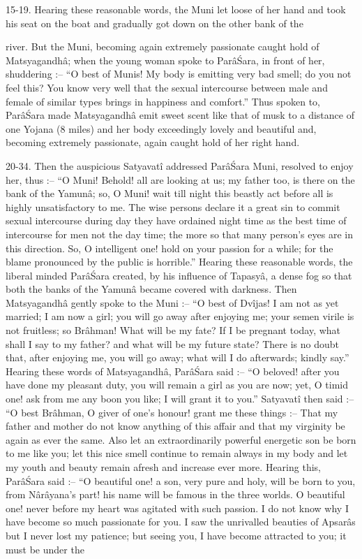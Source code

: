 15-19. Hearing these reasonable words, the Muni let loose of her hand and took his seat on the boat and gradually got down on the other bank of the


river. But the Muni, becoming again extremely passionate caught hold of Matsyagandh\^a; when the young woman spoke to Par\^a\'Sara, in front of her, shuddering :-- ``O best of Munis! My body is emitting very bad smell; do you not feel this? You know very well that the sexual intercourse between male and female of similar types brings in happiness and comfort.'' Thus spoken to, Par\^a\'Sara made Matsyagandh\^a emit sweet scent like that of musk to a distance of one Yojana (8 miles) and her body exceedingly lovely and beautiful and, becoming extremely passionate, again caught hold of her right hand.

20-34. Then the auspicious Satyavat\^i addressed Par\^a\'Sara Muni, resolved to enjoy her, thus :-- ``O Muni! Behold! all are looking at us; my father too, is there on the bank of the Yamun\^a; so, O Muni! wait till night this beastly act before all is highly unsatisfactory to me. The wise persons declare it a great sin to commit sexual intercourse during day they have ordained night time as the best time of intercourse for men not the day time; the more so that many person's eyes are in this direction. So, O intelligent one! hold on your passion for a while; for the blame pronounced by the public is horrible.'' Hearing these reasonable words, the liberal minded Par\^a\'Sara created, by his influence of Tapasy\^a, a dense fog so that both the banks of the Yamun\^a became covered with darkness. Then Matsyagandh\^a gently spoke to the Muni :-- ``O best of Dv\^ijas! I am not as yet married; I am now a girl; you will go away after enjoying me; your semen virile is not fruitless; so Br\^ahman! What will be my fate? If I be pregnant today, what shall I say to my father? and what will be my future state? There is no doubt that, after enjoying me, you will go away; what will I do afterwards; kindly say.'' Hearing these words of Matsyagandh\^a, Par\^a\'Sara said :-- ``O beloved! after you have done my pleasant duty, you will remain a girl as you are now; yet, O timid one! ask from me any boon you like; I will grant it to you.'' Satyavat\^i then said :-- ``O best Br\^ahman, O giver of one's honour! grant me these things :-- That my father and mother do not know anything of this affair and that my virginity be again as ever the same. Also let an extraordinarily powerful energetic son be born to me like you; let this nice smell continue to remain always in my body and let my youth and beauty remain afresh and increase ever more. Hearing this, Par\^a\'Sara said :-- ``O beautiful one! a son, very pure and holy, will be born to you, from N\^ar\^ayana's part! his name will be famous in the three worlds. O beautiful one! never before my heart was agitated with such passion. I do not know why I have become so much passionate for you. I saw the unrivalled beauties of Apsar\^as but I never lost my patience; but seeing you, I have become attracted to you; it must be under the


